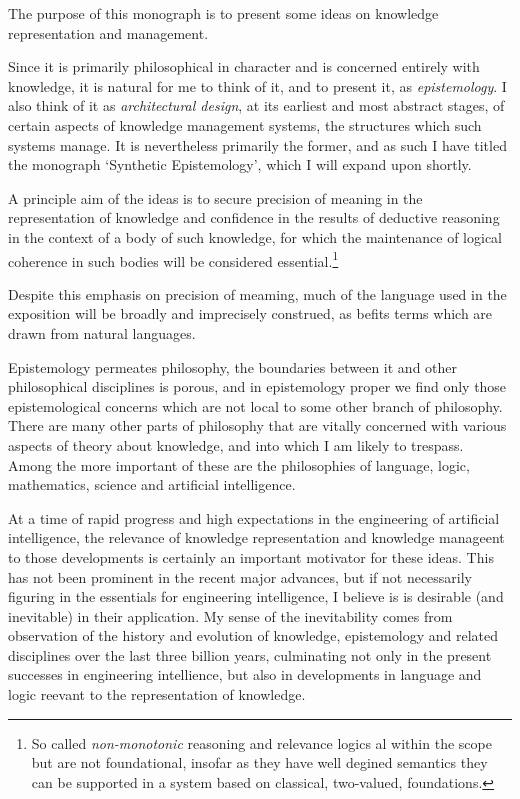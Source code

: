 The purpose of this monograph is to present some ideas on knowledge representation and management.

Since it is primarily philosophical in character and is concerned entirely with knowledge, it is natural for me to think of it, and to present it, as \emph{epistemology}.
I also think of it as \emph{architectural design}, at its earliest and most abstract stages, of certain aspects of knowledge management systems, the structures which such systems manage.
It is nevertheless primarily the former, and as such I have titled the monograph `Synthetic Epistemology', which I will expand upon shortly.

A principle aim of the ideas is to secure precision of meaning in the representation of knowledge and confidence in the results of deductive reasoning in the context of a body of such knowledge, for which the maintenance of logical coherence in such bodies will be considered essential.\footnote{So called \emph{non-monotonic} reasoning and relevance logics al within the scope but are not foundational, insofar as they have well degined semantics they can be supported in a system based on classical, two-valued, foundations.}

Despite this emphasis on precision of meaming, much of the language used in the exposition will be broadly and imprecisely construed, as befits terms which are drawn from natural languages.






Epistemology permeates philosophy, the boundaries between it and other philosophical disciplines is porous, and in epistemology proper we find only those epistemological concerns which are not local to some other branch of philosophy.
There are many other parts of philosophy that are vitally concerned with various aspects of theory about knowledge, and into which I am likely to trespass.
Among the more important of these are the philosophies of language, logic, mathematics, science and artificial intelligence.

At a time of rapid progress and high expectations in the engineering of artificial intelligence, the relevance of knowledge representation and knowledge manageent to those developments is certainly an important motivator for these ideas.
This has not been prominent in the recent major advances, but if not necessarily figuring in the essentials for engineering intelligence, I believe is is desirable (and inevitable) in their application.
My sense of the inevitability comes from observation of the history and evolution of knowledge, epistemology and related disciplines over the last three billion years, culminating not only in the present successes in engineering intellience, but also in developments in language and logic reevant to the representation of knowledge.


